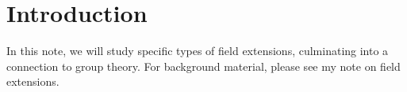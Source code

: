 \section{Introduction}

In this note, we will study specific types of field extensions, culminating into a connection to group theory. For background material, please see my note on field extensions.
